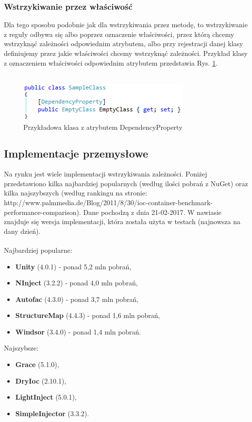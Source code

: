 \documentclass[12pt]{article}
\begin{document}
\subsubsection{Wstrzykiwanie przez właściwość}
Dla tego sposobu podobnie jak dla wstrzykiwania przez metodę, to wstrzykiwanie z reguły odbywa się albo poprzez oznaczenie właściwości, przez którą chcemy wstrzyknąć zależności odpowiednim atrybutem, albo przy rejestracji danej klasy definiujemy przez jakie właściwości chcemy wstrzyknąć zależności. Przykład klasy z oznaczeniem właściwości odpowiednim atrybutem przedstawia Rys. \ref{fig:DependencyProperty}.\\ \\
\begin{figure}[H]
	\begin{center}
  		\includegraphics{DependencyProperty.png}
  		\caption{Przykładowa klasa z atrybutem DependencyProperty}
  		\label{fig:DependencyProperty}
	\end{center}
\end{figure}


\subsection{Implementacje przemysłowe}
Na rynku jest wiele implementacji wstrzykiwania zależności. Poniżej przedstawiono kilka najbardziej popularnych (według ilości pobrań z NuGet) oraz kilka najszybszych (według rankingu na stronie: http://www.palmmedia.de/Blog/2011/8/30/ioc-container-benchmark-performance-comparison). Dane pochodzą z dnia 21-02-2017. W nawiasie znajduje się wersja implementacji, która została użyta w testach (najnowsza na dany dzień).\\
\\
Najbardziej popularne:
\begin{itemize}
	\item \textbf{Unity} (4.0.1) - ponad 5,2 mln pobrań,
	\item \textbf{NInject} (3.2.2) - ponad 4,0 mln pobrań,
	\item \textbf{Autofac} (4.3.0) - ponad 3,7 mln pobrań,
	\item \textbf{StructureMap} (4.4.3) - ponad 1,6 mln pobrań,
	\item \textbf{Windsor} (3.4.0) - ponad 1,4 mln pobrań.
\end{itemize}
Najszybsze:
\begin{itemize}
	\item \textbf{Grace} (5.1.0),
	\item \textbf{DryIoc} (2.10.1),
	\item \textbf{LightInject} (5.0.1),
	\item \textbf{SimpleInjector} (3.3.2).
\end{itemize}
\end{document}
